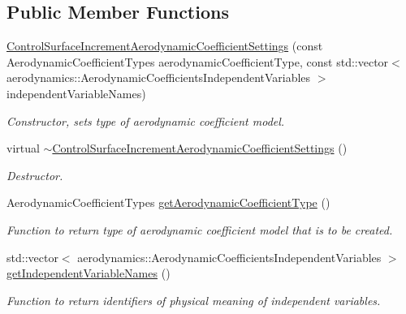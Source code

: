 \subsection*{Public Member Functions}
\begin{DoxyCompactItemize}
\item 
\hyperlink{classtudat_1_1simulation__setup_1_1ControlSurfaceIncrementAerodynamicCoefficientSettings_a97d037ad3dce6fcc57800d6287679182}{Control\+Surface\+Increment\+Aerodynamic\+Coefficient\+Settings} (const Aerodynamic\+Coefficient\+Types aerodynamic\+Coefficient\+Type, const std\+::vector$<$ aerodynamics\+::\+Aerodynamic\+Coefficients\+Independent\+Variables $>$ independent\+Variable\+Names)
\begin{DoxyCompactList}\small\item\em Constructor, sets type of aerodynamic coefficient model. \end{DoxyCompactList}\item 
virtual \hyperlink{classtudat_1_1simulation__setup_1_1ControlSurfaceIncrementAerodynamicCoefficientSettings_a6beb2ad3f82e5b0babb625885717c66b}{$\sim$\+Control\+Surface\+Increment\+Aerodynamic\+Coefficient\+Settings} ()\hypertarget{classtudat_1_1simulation__setup_1_1ControlSurfaceIncrementAerodynamicCoefficientSettings_a6beb2ad3f82e5b0babb625885717c66b}{}\label{classtudat_1_1simulation__setup_1_1ControlSurfaceIncrementAerodynamicCoefficientSettings_a6beb2ad3f82e5b0babb625885717c66b}

\begin{DoxyCompactList}\small\item\em Destructor. \end{DoxyCompactList}\item 
Aerodynamic\+Coefficient\+Types \hyperlink{classtudat_1_1simulation__setup_1_1ControlSurfaceIncrementAerodynamicCoefficientSettings_a3301cfb6ed27265686a12d4da18a990d}{get\+Aerodynamic\+Coefficient\+Type} ()
\begin{DoxyCompactList}\small\item\em Function to return type of aerodynamic coefficient model that is to be created. \end{DoxyCompactList}\item 
std\+::vector$<$ aerodynamics\+::\+Aerodynamic\+Coefficients\+Independent\+Variables $>$ \hyperlink{classtudat_1_1simulation__setup_1_1ControlSurfaceIncrementAerodynamicCoefficientSettings_a6c3effe7bf5971c3194fd749df45a9c4}{get\+Independent\+Variable\+Names} ()
\begin{DoxyCompactList}\small\item\em Function to return identifiers of physical meaning of independent variables. \end{DoxyCompactList}\end{DoxyCompactItemize}
